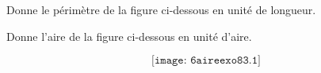 \begin{myenumerate}
\item Donne le périmètre de la figure ci-dessous en unité de longueur.
\item Donne l'aire de la figure ci-dessous en unité d'aire.
\end{myenumerate}
\[\texttt{[image: 6aireexo83.1]}\] 
